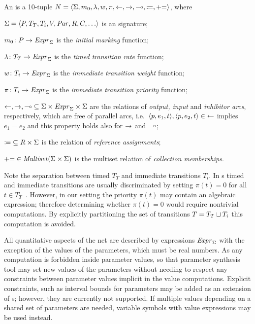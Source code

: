 \begin{dfn}
  An \emph{} is a 10-tuple \(N = \langle \Sigma, m_0, \lambda, w, \pi, {\leftarrow}, {\rightarrow}, {\multimap}, {\coloneq}, {\mathrel{{+}{=}}} \rangle\), where
  \begin{compactitem}
  \item \(\Sigma = \langle P, T_T, T_i, V, \textrm{\itshape Par\/}, R, C, \ldots\rangle\) is an  signature;
  \item \(m_0 \colon P \rightarrow \textrm{\itshape Expr\/}_\Sigma\) is the \emph{initial marking} function;
  \item \(\lambda \colon T_T \rightarrow \textrm{\itshape Expr\/}_\Sigma\) is the \emph{timed transition rate} function;
  \item \(w\colon T_i \rightarrow \textrm{\itshape Expr\/}_\Sigma\) is the \emph{immediate transition weight} function;
  \item \(\pi\colon T_i \rightarrow \textrm{\itshape Expr\/}_\Sigma\) is the \emph{immediate transition priority} function;
  \item \({\leftarrow}, {\rightarrow}, {\multimap} \subseteq \Sigma \times \textrm{\itshape Expr\/}_\Sigma \times \Sigma\) are the relations of \emph{output, input} and \emph{inhibitor arcs}, respectively, which are free of parallel arcs, i.e.~\(\langle p, e_1, t \rangle, \langle p, e_2, t \rangle \in {\leftarrow}\) implies \(e_1 = e_2\) and this property holds also for \(\rightarrow\) and \(\multimap\);
  \item \({\coloneq} \subseteq R \times \Sigma\) is the relation of \emph{reference assignments};
  \item \({\mathrel{{+}{=}}} \in \textrm{\itshape Multiset\/}(\Sigma \times \Sigma)\) is the multiset relation of \emph{collection memberships}.
  \end{compactitem}
\end{dfn}

Note the separation between timed \(T_T\) and immediate transitions \(T_i\). In s timed and immediate transitions are usually discriminated by setting \(\pi(t) = 0\) for all \(t \in T_T\)~\citep{Marsan84gspn}. However, in our setting the priority \(\pi(t)\) may contain an algebraic expression; therefore determining whether \(\pi(t) = 0\) would require nontrivial computations. By explicitly partitioning the set of transitions \(T = T_T \sqcup T_i\) this computation is avoided.
 
All quantitative aspects of the net are described by expressions \(\textrm{\itshape Expr\/}_\Sigma\) with the exception of the values of the parameters, which must be real numbers. As any computation is forbidden inside parameter values, so that parameter synthesis tool may set new values of the parameters without needing to respect any constraints between parameter values implicit in the value computations. Explicit constraints, such as interval bounds for parameters may be added as an extension of s; however, they are currently not supported. If multiple values depending on a shared set of parameters are needed, variable symbols with value expressions may be used instead.

